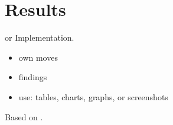 \chapter{Results}
    or Implementation.
    \begin{itemize}
        \item own moves
        \item findings
        \item use: tables, charts, graphs, or screenshots
    \end{itemize}
    Based on \cite{AssignmentExpert2026}.